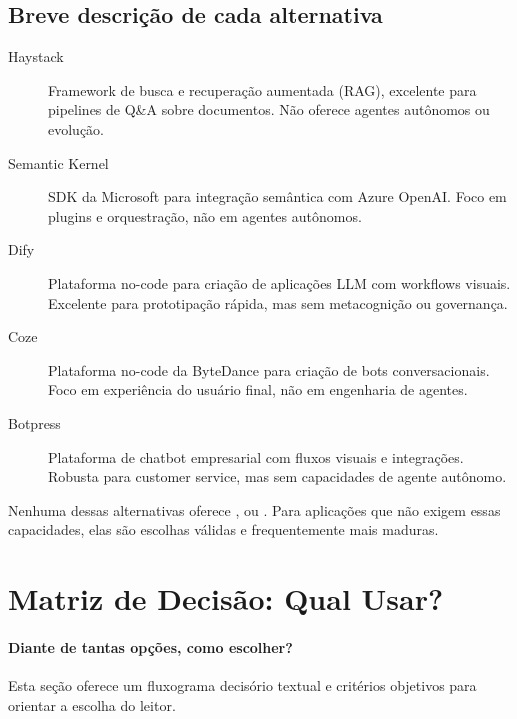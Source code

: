 \subsection{Breve descrição de cada alternativa}
\begin{description}
\item[Haystack] Framework de busca e recuperação aumentada
(RAG), excelente para pipelines de Q\&A sobre documentos.
Não oferece agentes autônomos ou evolução.
\item[Semantic Kernel] SDK da Microsoft para integração semântica
com Azure OpenAI. Foco em plugins e orquestração, não em
agentes autônomos.
\item[Dify] Plataforma no-code para criação de aplicações LLM com
workflows visuais. Excelente para prototipação rápida, mas sem
metacognição ou governança.
\item[Coze] Plataforma no-code da ByteDance para criação de bots
conversacionais. Foco em experiência do usuário final, não em
engenharia de agentes.
\item[Botpress] Plataforma de chatbot empresarial com fluxos
visuais e integrações. Robusta para customer service, mas sem
capacidades de agente autônomo.
\end{description}
\noindent Nenhuma dessas alternativas oferece ,  ou . Para aplicações que não exigem essas capacidades, elas
são escolhas válidas e frequentemente mais maduras.
\section{Matriz de Decisão: Qual Usar?}
\label{sec:matriz-decisao}
\nivelintermediario
\paragraph{Diante de tantas opções, como escolher?} Esta seção oferece um
fluxograma decisório textual e critérios objetivos para orientar a escolha
do leitor.

